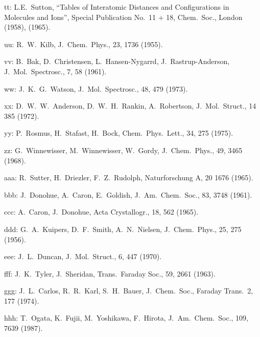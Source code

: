 \begin{description}
\item{  tt: } L.E.\ Sutton, ``Tables of Interatomic Distances and Configurations in
       Molecules and Ions'', Special Publication No.\ 11 + 18, Chem.\ Soc.,
       London (1958), (1965).
  
\item{  uu: } R.\ W.\ Kilb, J.\ Chem.\ Phys., 23, 1736 (1955).
  
\item{  vv: } B.\ Bak, D.\ Christensen, L.\ Hansen-Nygarrd, J.\ Rastrup-Anderson,
       J.\ Mol.\ Spectrosc., 7, 58 (1961).
  
\item{  ww: } J.\ K.\ G.\ Watson, J.\ Mol.\ Spectrosc., 48, 479 (1973).
  
\item{  xx: } D.\ W.\ W.\ Anderson, D.\ W.\ H.\ Rankin, A.\ Robertson, J.\ Mol.\ Struct., 14
       385 (1972).
  
\item{  yy: } P.\ Rosmus, H.\ Stafast, H.\ Bock, Chem.\ Phys.\ Lett., 34, 275 (1975).
  
\item{  zz: } G.\ Winnewisser, M.\ Winnewisser, W.\ Gordy, J.\ Chem.\ Phys., 49, 3465 (1968).
  
\item{ aaa: } R.\ Sutter, H.\ Driezler, F.\ Z.\ Rudolph, Naturforschung A, 20 1676 (1965).
  
\item{ bbb: } J.\ Donohue, A.\ Caron, E.\ Goldish, J.\ Am.\ Chem.\ Soc., 83, 3748 (1961).
  
\item{ ccc: } A.\ Caron, J.\ Donohue, Acta Crystallogr., 18, 562 (1965).
  
\item{ ddd: } G.\ A.\ Kuipers, D.\ F.\ Smith, A.\ N.\ Nielsen, J.\ Chem.\ Phys., 25, 275 (1956).
  
\item{ eee: } J.\ L.\ Duncan, J.\ Mol.\ Struct., 6, 447 (1970).
  
\item{ fff: } J.\ K.\ Tyler, J.\ Sheridan, Trans.\ Faraday Soc., 59, 2661 (1963).
  
\item{ ggg: } J.\ L.\ Carlos, R.\ R.\ Karl, S.\ H.\ Bauer, J.\ Chem.\ Soc., Faraday Trans.\ 2,
       177 (1974).
  
\item{ hhh: } T.\ Ogata, K.\ Fujii, M.\ Yoshikawa, F.\ Hirota, J.\ Am.\ Chem.\ Soc., 109,
       7639 (1987).
  

\end{description}
